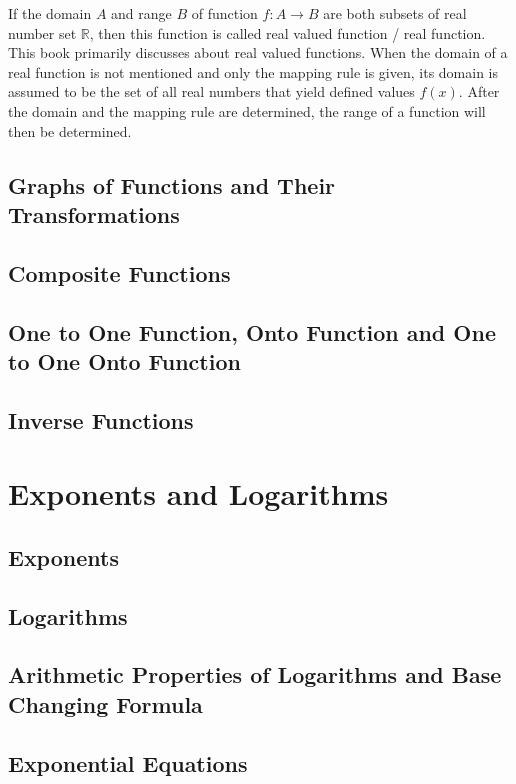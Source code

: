 \documentclass{report}
\begin{document}
\begin{multicols}{2}
  If the domain $A$ and range $B$ of function $f: A\to B$ are both subsets of
  real number set $\mathbb{R}$, then this function is called real valued function
  / real function. This book primarily discusses about real valued functions.
  When the domain of a real function is not mentioned and only the mapping rule
  is given, its domain is assumed to be the set of all real numbers that yield
  defined values $f(x)$. After the domain and the mapping rule are determined,
  the range of a function will then be determined.

  \section{Graphs of Functions and Their Transformations}

  \section{Composite Functions}

  \section{One to One Function, Onto Function and One to One Onto Function}

  \section{Inverse Functions}

  \chapter{Exponents and Logarithms}

  \section{Exponents}

  \section{Logarithms}

  \section{Arithmetic Properties of Logarithms and Base Changing Formula}

  \section{Exponential Equations}


\end{multicols}
\end{document}
